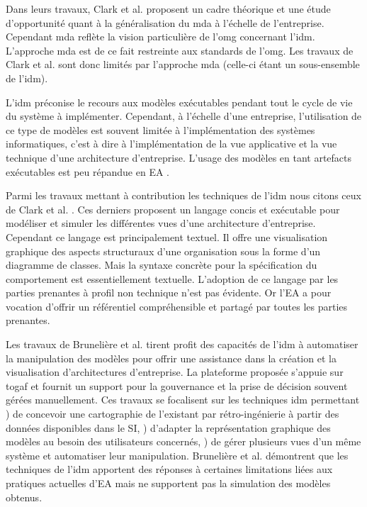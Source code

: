 Dans leurs travaux, Clark et al. \cite{clark_towards_2014} proposent un cadre théorique et une étude d'opportunité quant à la généralisation du \gls{mda} à l'échelle de l'entreprise. Cependant \gls{mda} reflète la vision particulière de l'\gls{omg} concernant l'\gls{idm}. L'approche \gls{mda} est de ce fait restreinte aux standards de l'\gls{omg}. Les travaux de Clark et al. sont donc limités par l'approche \gls{mda} (celle-ci étant un sous-ensemble de l'\gls{idm}).

L'\gls{idm} préconise le recours aux modèles exécutables pendant tout le cycle de vie du système à implémenter. Cependant, à l'échelle d'une entreprise, l'utilisation de ce type de modèles est souvent limitée à l'implémentation des systèmes informatiques, c'est à dire à l'implémentation de la vue applicative et la vue technique d'une architecture d'entreprise. L'usage des modèles en tant artefacts exécutables est peu répandue en EA \cite{kulkarni_modelling_2013}.

Parmi les travaux mettant à contribution les techniques de l'\gls{idm} nous citons ceux de Clark et al. \cite{clark2011leap}. Ces derniers proposent un langage concis et exécutable pour modéliser et simuler les différentes vues d'une architecture d'entreprise. Cependant ce langage est principalement textuel. Il offre une visualisation graphique des aspects structuraux d'une organisation sous la forme d'un diagramme de classes. Mais la syntaxe concrète pour la spécification du comportement est essentiellement textuelle. L'adoption de ce langage par les parties prenantes à profil non technique n'est pas évidente. Or l'EA a pour vocation d'offrir un référentiel compréhensible et partagé par toutes les parties prenantes.

Les travaux de Brunelière et al. \cite{bruneliere2013mde} tirent profit des capacités de l'\gls{idm} à automatiser la manipulation des modèles pour offrir une assistance dans la création et la visualisation d'architectures d'entreprise. La plateforme proposée s'appuie sur \gls{togaf} et fournit un support pour la gouvernance et la prise de décision souvent gérées manuellement. Ces travaux se focalisent sur les techniques \gls{idm} permettant \primo\!) de concevoir une cartographie de l'existant par rétro-ingénierie à partir des données disponibles dans le SI, \secundo\!) d'adapter la représentation graphique des modèles au besoin des utilisateurs concernés, \tertio\!) de gérer plusieurs vues d'un même système et automatiser leur manipulation. Brunelière et al. \cite{bruneliere2013mde} démontrent que les techniques de l'\gls{idm} apportent des réponses à certaines limitations liées aux pratiques actuelles d'EA mais ne supportent pas la simulation des modèles obtenus. 

